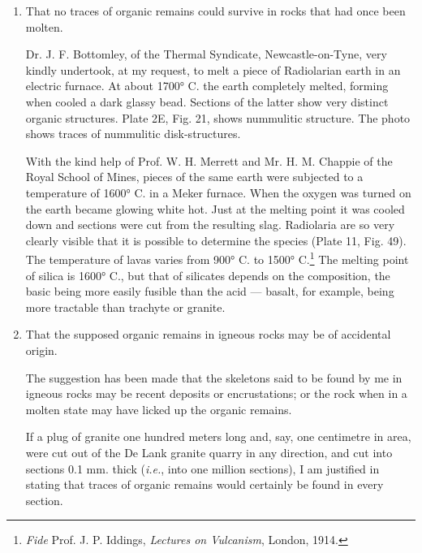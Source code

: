 \documentclass[a4paper, 12pt, oneside]{article}
\begin{document}
\begin{enumerate}
  \item That no traces of organic remains could survive in rocks that had once been molten.

\hspace*{5mm}Dr. J. F. Bottomley, of the Thermal Syndicate, Newcastle-on-Tyne, very kindly undertook, at my request, to melt a piece of Radiolarian earth in an electric furnace. At about 1700° C. the earth completely melted, forming when cooled a dark glassy bead. Sections of the latter show very distinct organic structures. Plate 2E, Fig. 21, shows nummulitic structure. The photo shows traces of nummulitic disk-structures.

\hspace*{5mm}With the kind help of Prof. W. H. Merrett and Mr. H. M. Chappie of the Royal School of Mines, pieces of the same earth were subjected to a temperature of 1600° C. in a Meker furnace. When the oxygen was turned on the earth became glowing white hot. Just at the melting point it was cooled down and sections were cut from the resulting slag. Radiolaria are so very clearly visible that it is possible to determine the species (Plate 11, Fig. 49). The temperature of lavas varies from 900° C. to 1500° C.\footnote{\emph{Fide} Prof. J. P. Iddings, \emph{Lectures on Vulcanism}, London, 1914.} The melting point of silica is 1600° C., but that of silicates depends on the composition, the basic being more easily fusible than the acid --- basalt, for example, being more tractable than trachyte or granite.

  \item That the supposed organic remains in igneous rocks may be of accidental origin.

\hspace*{5mm}The suggestion has been made that the skeletons said to be found by me in igneous rocks may be recent deposits or encrustations; or the rock when in a molten state may have licked up the organic remains.

\hspace*{5mm}If a plug of granite one hundred meters long and, say, one centimetre in area, were cut out of the De Lank granite quarry in any direction, and cut into sections 0.1 mm. thick (\emph{i.e.}, into one million sections), I am justified in stating that traces of organic remains would certainly be found in every section.


\end{enumerate}
\end{document}
